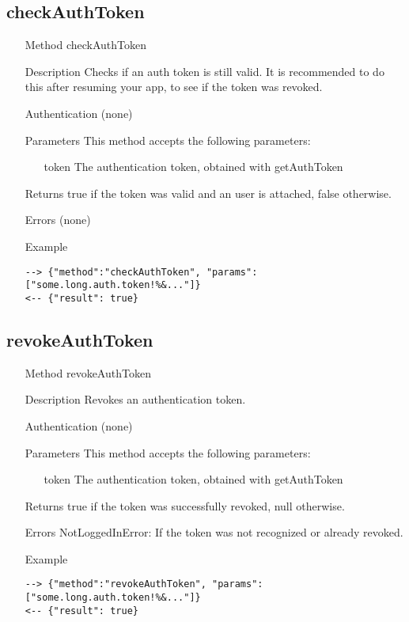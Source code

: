 \documentclass[a4paper]{scrreprt}
\begin{document}
\clearpage
\subsection{checkAuthToken}
\begin{enumerate}
\item[Method] checkAuthToken
\item[Description] Checks if an auth token is still valid. It is recommended to do this after resuming your app, to see if the token was revoked.
\item[Authentication] (none)
\item[Parameters] This method accepts the following parameters:
\begin{enumerate}
    \item[token] The authentication token, obtained with getAuthToken
    \end{enumerate}
\item[Returns] true if the token was valid and an user is attached, false otherwise.
\item[Errors] (none)
\item[Example]
\begin{lstlisting}
--> {"method":"checkAuthToken", "params":["some.long.auth.token!%&..."]}
<-- {"result": true}
\end{lstlisting}
\end{enumerate}

\subsection{revokeAuthToken}
\begin{enumerate}
\item[Method] revokeAuthToken
\item[Description] Revokes an authentication token.
\item[Authentication] (none)
\item[Parameters] This method accepts the following parameters:
\begin{enumerate}
    \item[token] The authentication token, obtained with getAuthToken
    \end{enumerate}
\item[Returns] true if the token was successfully revoked, null otherwise.
\item[Errors] NotLoggedInError: If the token was not recognized or already revoked.
\item[Example]
\begin{lstlisting}
--> {"method":"revokeAuthToken", "params":["some.long.auth.token!%&..."]}
<-- {"result": true}
\end{lstlisting}
\end{enumerate}
\end{document}

